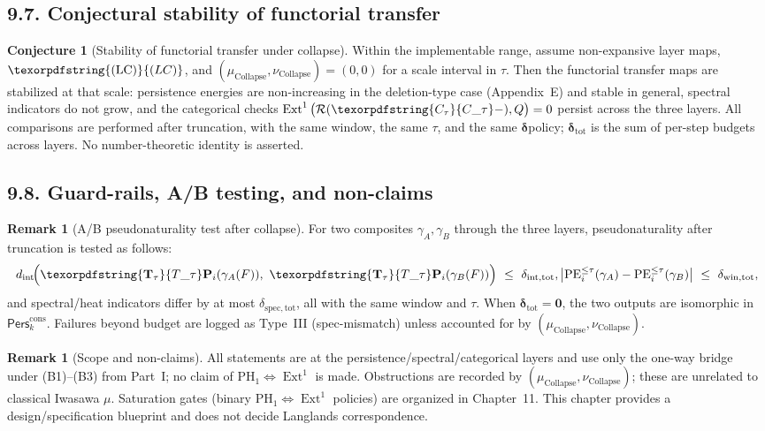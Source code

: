 \documentclass[11pt]{article}
\numberwithin{equation}{section}
\theoremstyle{plain}
\theoremstyle{definition}
\theoremstyle{remark}
\DeclareMathOperator{\Ext}{Ext}
\DeclareRobustCommand{\hyp}{\nobreakdash-}
\newcommand{\Pers}{\mathsf{Pers}}
\newcommand{\Rfun}{\mathcal{R}}
\theoremstyle{plain}
\theoremstyle{definition}
\numberwithin{equation}{section}
\newtheorem{conjecture}{Conjecture}[section]
\theoremstyle{definition}
\newtheorem{remark}[theorem]{Remark}
\DeclareRobustCommand{\Perskft}{\Pers^{\mathrm{cons}}_{k}}
\DeclareRobustCommand{\Ttau}{\texorpdfstring{\ensuremath{\mathbf{T}_{\tau}}}{T\_\tau}}
\DeclareRobustCommand{\Ctau}{\texorpdfstring{\ensuremath{C_{\tau}}}{C\_\tau}}
\DeclareRobustCommand{\muc}{\mu_{\mathrm{Collapse}}}
\DeclareRobustCommand{\nuc}{\nu_{\mathrm{Collapse}}}
\DeclareRobustCommand{\LC}{\texorpdfstring{\ensuremath{\mathrm{(LC)}}}{(LC)}}
\numberwithin{equation}{section}
\theoremstyle{plain}
\theoremstyle{definition}
\theoremstyle{remark}
\providecommand{\Cfun}[1]{\mathsf{C}_{#1}}
\providecommand{\Tfun}[1]{\mathbf{T}_{#1}}
\providecommand{\Ctau}{\Cfun{\tau}}
\providecommand{\Ttau}{\Tfun{\tau}}
\providecommand{\muc}{\mu_{\mathrm{Collapse}}}
\providecommand{\nuc}{\nu_{\mathrm{Collapse}}}
\providecommand{\n}{\unskip\space}
\begin{document}
\subsection*{9.7. Conjectural stability of functorial transfer}
\begin{conjecture}[Stability of functorial transfer under collapse]\label{conj:9-stability}
Within the implementable range, assume non\hyp expansive layer maps, \(\LC\), and \((\muc,\nuc)=(0,0)\) for a scale interval in \(\tau\).
Then the functorial transfer maps are stabilized at that scale: persistence energies are non\hyp increasing in the deletion\hyp type case (Appendix~E) and stable in general, spectral indicators do not grow, and the categorical checks \(\Ext^1\big(\Rfun(\Ctau -),Q\big)=0\) persist across the three layers.
All comparisons are performed after truncation, with the same window, the same \(\tau\), and the same \(\boldsymbol{\delta}\)\nobreakdash policy; \(\boldsymbol{\delta}_{\mathrm{tot}}\) is the sum of per\hyp step budgets across layers.
No number\hyp theoretic identity is asserted.
\end{conjecture}

\subsection*{9.8. Guard\hyp rails, A/B testing, and non\hyp claims}
\begin{remark}[A/B pseudonaturality test after collapse]\label{rk:9-AB}
For two composites \(\gamma_A,\gamma_B\) through the three layers,
pseudonaturality after truncation is tested as follows:
\[
d_{\mathrm{int}}\!\Big(\Ttau\mathbf{P}_i(\gamma_A(F)),\ \Ttau\mathbf{P}_i(\gamma_B(F))\Big)\ \le\ \delta_{\mathrm{int,tot}},\qquad\n\big|\mathrm{PE}_i^{\le\tau}(\gamma_A)-\mathrm{PE}_i^{\le\tau}(\gamma_B)\big|\ \le\ \delta_{\mathrm{win,tot}},
\]
and spectral/heat indicators differ by at most \(\delta_{\mathrm{spec,tot}}\), all with the same window and \(\tau\).
When \(\boldsymbol{\delta}_{\mathrm{tot}}=\mathbf{0}\), the two outputs are isomorphic in \(\Perskft\).
Failures beyond budget are logged as Type~III (spec\hyp mismatch) unless accounted for by \((\muc,\nuc)\).
\end{remark}

\begin{remark}[Scope and non\hyp claims]\label{rk:9-guard}
All statements are at the persistence/spectral/categorical layers and use only the one\hyp way bridge under (B1)–(B3) from Part~I; no claim of \(\mathrm{PH}_1\Leftrightarrow\Ext^1\) is made.
Obstructions are recorded by \((\muc,\nuc)\); these are unrelated to classical Iwasawa \(\mu\).
Saturation gates (binary \(\mathrm{PH}_1\)\(\Leftrightarrow\)\(\Ext^1\) policies) are organized in Chapter~11.
This chapter provides a design/specification blueprint and does not decide Langlands correspondence.
\end{remark}
\end{document}
